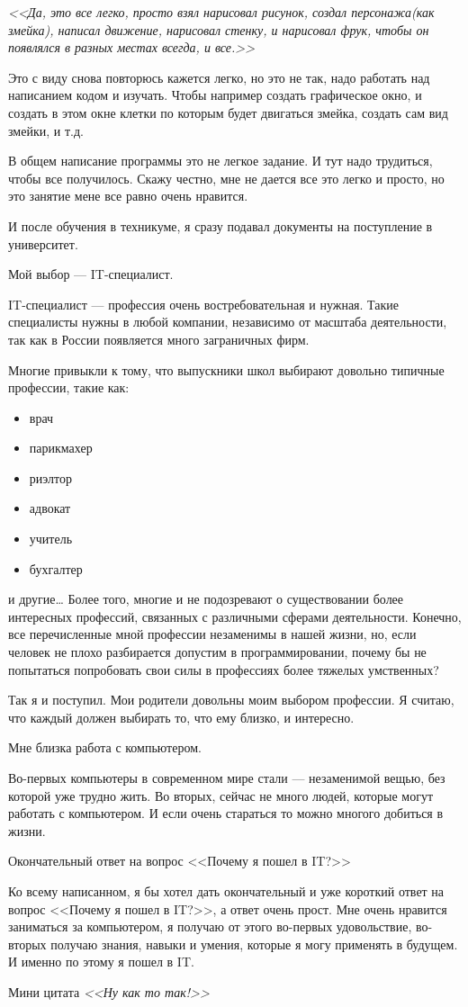 \textit{<<Да, это все легко, просто взял нарисовал рисунок, создал персонажа(как змейка), написал движение, нарисовал стенку, и нарисовал фрук, чтобы он появлялся в разных местах всегда, и все.>>}

Это с виду снова повторюсь кажется легко, но это не так, надо работать над написанием кодом и изучать. Чтобы например создать графическое окно, и создать в этом окне клетки по которым будет двигаться змейка, создать сам вид змейки, и т.д.

В общем написание программы это не легкое задание. И тут надо трудиться, чтобы все получилось. Скажу честно, мне не дается все это легко и просто, но это занятие мене все равно очень нравится.

И после обучения в техникуме, я сразу подавал документы на поступление в университет.

Мой выбор --- IT-специалист.

IT-специалист --- профессия очень востребовательная и нужная. Такие специалисты нужны в любой компании, независимо от масштаба деятельности, так как в России появляется много заграничных фирм.

Многие привыкли к тому, что выпускники школ выбирают довольно типичные профессии, такие как:
\begin{itemize}
\item врач
\item парикмахер
\item риэлтор
\item адвокат
\item учитель
\item бухгалтер
\end{itemize}
и другие…
Более того, многие и не подозревают о существовании более интересных профессий, связанных с различными сферами деятельности. Конечно, все перечисленные мной профессии незаменимы в нашей жизни, но, если человек не плохо разбирается допустим в программировании, почему бы не попытаться попробовать свои силы в профессиях более тяжелых умственных?

Так я и поступил. Мои родители довольны моим выбором профессии. Я считаю, что каждый должен выбирать то, что ему близко, и интересно.

Мне близка работа с компьютером.

Во-первых компьютеры в современном мире стали --- незаменимой вещью, без которой уже трудно жить.
Во вторых, сейчас не много людей, которые могут работать с компьютером.
И если очень стараться то можно многого добиться в жизни.

Окончательный ответ на вопрос <<Почему я пошел в IT?>>

Ко всему написанном, я бы хотел дать окончательный и уже короткий ответ на вопрос <<Почему я пошел в IT?>>, а ответ очень прост. Мне очень нравится заниматься за компьютером, я получаю от этого во-первых удовольствие, во-вторых получаю знания, навыки и умения, которые я могу применять в будущем. И именно по этому я пошел в IT.

\noindent Мини цитата
\textit {<<Ну как то так!>>}